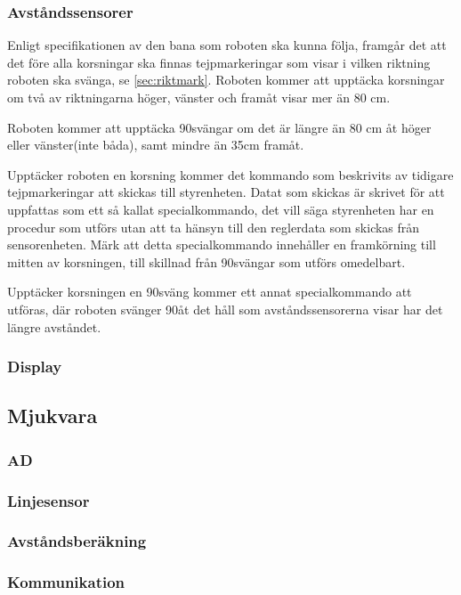 \subsubsection{Avståndssensorer}

\label{sec:upptackkorsning}
Enligt specifikationen av den bana som roboten ska kunna följa, framgår det att det före alla korsningar ska finnas tejpmarkeringar som visar i vilken riktning roboten ska svänga, se \ref{sec:riktmark}. Roboten kommer att upptäcka korsningar om två av riktningarna höger, vänster och framåt visar mer än 80 cm.

Roboten kommer att upptäcka 90\degree svängar om det är längre än 80 cm åt höger eller vänster(inte båda), samt mindre än 35cm framåt.

Upptäcker roboten en korsning kommer det kommando som beskrivits av tidigare tejpmarkeringar att skickas till styrenheten. Datat som skickas är skrivet för att uppfattas som ett så kallat specialkommando, det vill säga styrenheten har en procedur som utförs utan att ta hänsyn till den reglerdata som skickas från sensorenheten. Märk att detta specialkommando innehåller en framkörning till mitten av korsningen, till skillnad från 90\degree svängar som utförs omedelbart.

Upptäcker korsningen en 90\degree sväng kommer ett annat specialkommando att utföras, där roboten svänger 90\degree åt det håll som avståndssensorerna visar har det längre avståndet.


\subsubsection{Display}


\subsection{Mjukvara}

\subsubsection{AD}

\subsubsection{Linjesensor}


\subsubsection{Avståndsberäkning}


\subsubsection{Kommunikation}

